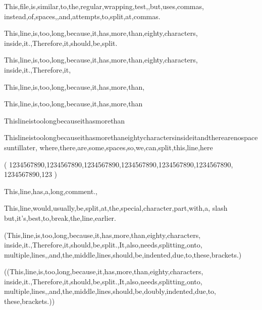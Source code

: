 \documentclass{article}
\begin{document}
This,file,is,similar,to,the,regular,wrapping,test,,but,uses,commas,
instead,of,spaces,,and,attempts,to,split,at,commas.

This,line,is,too,long,because,it,has,more,than,eighty,characters,
inside,it.,Therefore,it,should,be,split.

This,line,is,too,long,because,it,has,more,than,eighty,characters,
inside,it.,Therefore,it,%

This,line,is,too,long,because,it,has,more,than,%

This,line,is,too,long,because,it,has,more,than%

Thislineistoolongbecauseithasmorethan%

Thislineistoolongbecauseithasmorethaneightycharactersinsideitandtherearenospacesuntillater,
where,there,are,some,spaces,so,we,can,split,this,line,here

(
  1234567890,1234567890,1234567890,1234567890,1234567890,1234567890,
  1234567890,123
)

This,line,has,a,long,comment.,%


This,line,would,usually,be,split,at,the,special,character,part,with,a,
slash\,but,it's,best,to,break,the,line,earlier.

(This,line,is,too,long,because,it,has,more,than,eighty,characters,
  inside,it.,Therefore,it,should,be,split.,It,also,needs,splitting,onto,
multiple,lines,,and,the,middle,lines,should,be,indented,due,to,these,brackets.)

((This,line,is,too,long,because,it,has,more,than,eighty,characters,
    inside,it.,Therefore,it,should,be,split.,It,also,needs,splitting,onto,
    multiple,lines,,and,the,middle,lines,should,be,doubly,indented,due,to,
these,brackets.))
\end{document}
